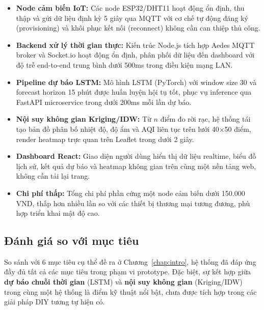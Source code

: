 \begin{itemize}[leftmargin=2cm]
  \item \textbf{Node cảm biến IoT:} Các node ESP32/DHT11 hoạt động
    ổn định, thu thập và gửi dữ liệu định kỳ 5 giây qua MQTT với
    cơ chế tự động đăng ký (provisioning) và khôi phục kết nối
    (reconnect) không cần can thiệp thủ công.

  \item \textbf{Backend xử lý thời gian thực:} Kiến trúc Node.js
    tích hợp Aedes MQTT broker và Socket.io hoạt động ổn định,
    phân phối dữ liệu đến dashboard với độ trễ end-to-end trung
    bình dưới 500ms trong điều kiện mạng LAN.

  \item \textbf{Pipeline dự báo LSTM:} Mô hình LSTM (PyTorch) với
    window size 30 và forecast horizon 15 phút được huấn luyện hội
    tụ tốt, phục vụ inference qua FastAPI microservice trong dưới
    200ms mỗi lần dự báo.

  \item \textbf{Nội suy không gian Kriging/IDW:} Từ $n$ điểm đo
    rời rạc, hệ thống tái tạo bản đồ phân bố nhiệt độ, độ ẩm và AQI
    liên tục trên lưới 40$\times$50 điểm, render heatmap trực quan
    trên Leaflet trong dưới 2 giây.

  \item \textbf{Dashboard React:} Giao diện người dùng hiển thị dữ
    liệu realtime, biểu đồ lịch sử, kết quả dự báo và heatmap
    không gian trên cùng một nền tảng web, không cần tải lại trang.

  \item \textbf{Chi phí thấp:} Tổng chi phí phần cứng một node
    cảm biến dưới 150.000 VND, thấp hơn nhiều lần so với các
    thiết bị thương mại tương đương, phù hợp triển khai mật độ cao.
\end{itemize}

\subsection{Đánh giá so với mục tiêu}
\label{subsec:conclusion:eval}

So sánh với 6 mục tiêu cụ thể đề ra ở Chương~\ref{chap:intro},
hệ thống đã đáp ứng đầy đủ tất cả các mục tiêu trong phạm vi
prototype. Đặc biệt, sự kết hợp giữa \textbf{dự báo chuỗi thời
gian} (LSTM) và \textbf{nội suy không gian} (Kriging/IDW) trong
cùng một hệ thống là điểm kỹ thuật nổi bật, chưa được tích hợp
trong các giải pháp DIY tương tự hiện có.

